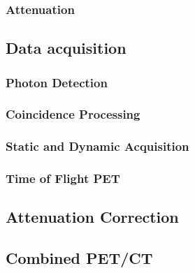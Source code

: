             \subsubsection{Attenuation} \label{attenuation}
                \blindtext
        
        \subsection{Data acquisition} \label{data_acquisition}
            \blindtext
            
            \subsubsection{Photon Detection} \label{photon_detection}
                \blindtext
            
            \subsubsection{Coincidence Processing} \label{coincidence_processing}
                \blindtext
            
            \subsubsection{Static and Dynamic Acquisition} \label{static_and_dynamic_acquisition}
                \blindtext
            
            \subsubsection{Time of Flight PET} \label{tof_pet}
                \blindtext
            
        \subsection{Attenuation Correction} \label{attenuation_correction}
            \blindtext
            
            \subsection{Combined PET/CT} \label{combined_pet_ct}
                \blindtext
    
